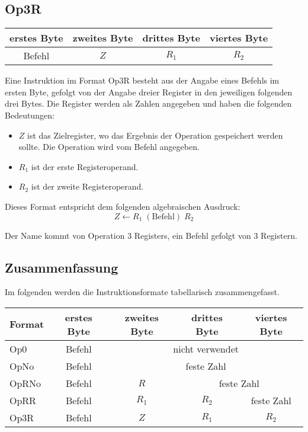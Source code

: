 \subsection{Op3R}

\begin{center}
  \begin{tabular}{|*{4}{c|}}
    \hline
    erstes Byte   & zweites Byte  & drittes Byte  & viertes Byte
    \\\hline\hline
    Befehl        & $Z$ & $R_{1}$ & $R_{2}$ 
    \\\hline
  \end{tabular}
\end{center}

Eine Instruktion im Format Op3R besteht aus der Angabe eines Befehls im ersten
Byte, gefolgt von der Angabe dreier Register in den jeweiligen folgenden drei
Bytes. Die Register werden als Zahlen angegeben und haben die folgenden
Bedeutungen:
\begin{itemize}
  \item $Z$ ist das Zielregister, wo das Ergebnis der Operation gespeichert
    werden sollte. Die Operation wird vom Befehl angegeben.
  \item $R_{1}$ ist der erste Registeroperand.
  \item $R_{2}$ ist der zweite Registeroperand.
\end{itemize}

Dieses Format entspricht dem folgenden algebraischen Ausdruck:
\[
    Z \gets R_{1} \; (\text{Befehl}) \; R_{2}
\]

Der Name kommt von \glqq Operation 3 Registers\grqq, ein Befehl gefolgt von 3
Registern.




\subsection{Zusammenfassung}
Im folgenden werden die Instruktionsformate tabellarisch zusammengefasst.


\begin{center}
  \begin{tabular}{|l||*{4}{c|}}
    \hline
    Format & erstes Byte & zweites Byte  & drittes Byte  & viertes Byte
    \\\hline\hline
    Op0 & Befehl         & \multicolumn{3}{c|}{nicht verwendet}
    \\\hline
    OpNo & Befehl        & \multicolumn{3}{c|}{feste Zahl}
    \\\hline
    OpRNo & Befehl       & $R$ & \multicolumn{2}{c|}{feste Zahl}
    \\\hline
    OpRR & Befehl        & $R_{1}$       & $R_{2}$ & feste Zahl
    \\\hline
    Op3R & Befehl        & $Z$           & $R_{1}$ & $R_{2}$ 
    \\\hline
  \end{tabular}
\end{center}




